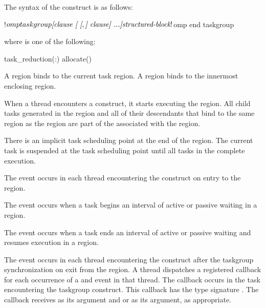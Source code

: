 \begin{fortranspecific}
The syntax of the  construct is as follows:

\begin{ompfPragma}
!$omp taskgroup \plc{[clause [ [},\plc{] clause] ...]}
    \plc{structured-block}
!$omp end taskgroup
\end{ompfPragma}

where  is one of the following:

\begin{indentedcodelist}
task_reduction(:)
allocate(\plc{[allocator: ]})
\end{indentedcodelist}

\end{fortranspecific}

\binding
A  region binds to the current task region. A  region binds to
the innermost enclosing  region.

\descr
When a thread encounters a  construct, it starts executing
the region. All child tasks generated in the  region and all
of their descendants that bind to the same  region as the
 region are part of the  associated with
the  region.

There is an implicit task scheduling point at the end of the 
region. The current task is suspended at the task scheduling point until all
tasks in the  complete execution.

\events
The  event occurs in each thread encountering the
 construct on entry to the  region.

The  event occurs when a task begins an interval of active or passive waiting
in a  region.

The  event occurs when a task ends an interval of active or passive waiting
and resumes execution in a  region.

The  event occurs in each thread encountering the
 construct after the taskgroup synchronization on exit from the
 region.
\tools
A thread dispatches a registered 
callback for each occurrence of a  and  event
in that thread.  The callback occurs in the task encountering
the taskgroup construct.  This callback has the type signature
.
The callback receives
 as its  argument and
 or 
as its  argument, as appropriate.

